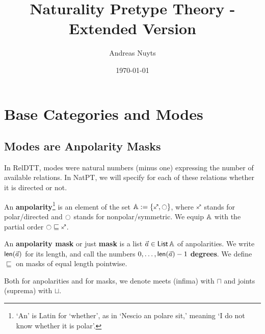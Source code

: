 \documentclass[a4paper]{memoir}
\newcommand{\thetitle}{Naturality Pretype Theory - Extended Version}
\newcommand{\theauthors}{Andreas Nuyts}
\begin{document}
	\addtolength{\voffset}{-.5in}

\title{\thetitle}
\date{\today}
\author{\theauthors{}}
\maketitle

\pagebreak

\tableofcontents

\pagebreak

\chapter{Base Categories and Modes}

\section{Modes are Anpolarity Masks}
In RelDTT, modes were natural numbers (minus one) expressing the number of available relations.
In NatPT, we will specify for each of these relations whether it is directed or not.
\begin{definition} \label{def:anpolarity}
	An \textbf{anpolarity}\footnote{`An' is Latin for `whether', as in `Nescio an polare sit,' meaning `I do not know whether it is polar'.} is an element of the set $\Anpolarity := \accol{\ypolar, \npolar}$, where $\ypolar$ stands for polar/directed and $\npolar$ stands for nonpolar/symmetric.
	We equip ${\mathbb{A}}$ with the partial order $\npolar \sqsubseteq \ypolar$.
	
	An \textbf{anpolarity mask} or just \textbf{mask} is a list $\vec a \in {\mathsf{List}}\,{\mathbb{A}}$ of anpolarities. We write $\mathsf{len}(\vec a)$ for its length, and call the numbers $0, \ldots, \mathsf{len}(\vec a) - 1$ \textbf{degrees}.
	We define $\sqsubseteq$ on masks of equal length pointwise.
	
	Both for anpolarities and for masks, we denote meets (infima) with $\sqcap$ and joints (suprema) with $\sqcup$.
\end{definition}
\end{document}
